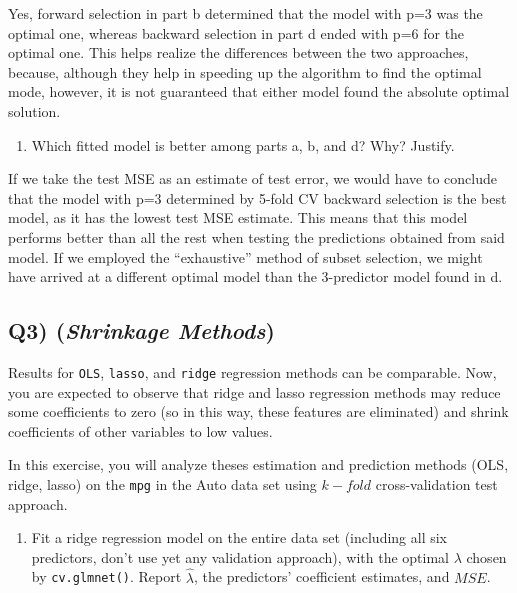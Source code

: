 \documentclass[
]{article}
\providecommand{\tightlist}{%
  \setlength{\itemsep}{0pt}\setlength{\parskip}{0pt}}
\begin{document}
Yes, forward selection in part b determined that the model with p=3 was
the optimal one, whereas backward selection in part d ended with p=6 for
the optimal one. This helps realize the differences between the two
approaches, because, although they help in speeding up the algorithm to
find the optimal mode, however, it is not guaranteed that either model
found the absolute optimal solution.

\begin{enumerate}
\def\labelenumi{\alph{enumi}.}
\setcounter{enumi}{5}
\tightlist
\item
  Which fitted model is better among parts a, b, and d? Why? Justify.
\end{enumerate}

If we take the test MSE as an estimate of test error, we would have to
conclude that the model with p=3 determined by 5-fold CV backward
selection is the best model, as it has the lowest test MSE estimate.
This means that this model performs better than all the rest when
testing the predictions obtained from said model. If we employed the
``exhaustive'' method of subset selection, we might have arrived at a
different optimal model than the 3-predictor model found in d.~

\hypertarget{q3-shrinkage-methods}{%
\subsection{\texorpdfstring{Q3) (\emph{Shrinkage
Methods})}{Q3) (Shrinkage Methods)}}\label{q3-shrinkage-methods}}

Results for \texttt{OLS}, \texttt{lasso}, and \texttt{ridge} regression
methods can be comparable. Now, you are expected to observe that ridge
and lasso regression methods may reduce some coefficients to zero (so in
this way, these features are eliminated) and shrink coefficients of
other variables to low values.

In this exercise, you will analyze theses estimation and prediction
methods (OLS, ridge, lasso) on the \texttt{mpg} in the Auto data set
using \(k-fold\) cross-validation test approach.

\begin{enumerate}
\def\labelenumi{\alph{enumi}.}
\tightlist
\item
  Fit a ridge regression model on the entire data set (including all six
  predictors, don't use yet any validation approach), with the optimal
  \(\lambda\) chosen by \texttt{cv.glmnet()}. Report \(\hat \lambda\),
  the predictors' coefficient estimates, and \(MSE\).
\end{enumerate}
\end{document}
